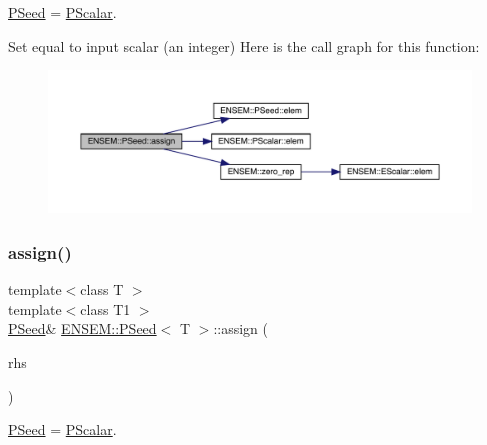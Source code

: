 \mbox{\hyperlink{classENSEM_1_1PSeed}{P\+Seed}} = \mbox{\hyperlink{classENSEM_1_1PScalar}{P\+Scalar}}. 

Set equal to input scalar (an integer) Here is the call graph for this function\+:
\nopagebreak
\begin{figure}[H]
\begin{center}
\leavevmode
\includegraphics[width=350pt]{dc/d14/classENSEM_1_1PSeed_a8d74bd21af23dfb165937c3bb546ea8f_cgraph}
\end{center}
\end{figure}
\mbox{\label{classENSEM_1_1PSeed_a8d74bd21af23dfb165937c3bb546ea8f}} 
\subsubsection{\texorpdfstring{assign()}{assign()}\hspace{0.1cm}{\footnotesize\ttfamily [3/3]}}
{\footnotesize\ttfamily template$<$class T $>$ \\
template$<$class T1 $>$ \\
\mbox{\hyperlink{classENSEM_1_1PSeed}{P\+Seed}}\& \mbox{\hyperlink{classENSEM_1_1PSeed}{E\+N\+S\+E\+M\+::\+P\+Seed}}$<$ T $>$\+::assign (\begin{DoxyParamCaption}\item[{const \mbox{\hyperlink{classENSEM_1_1PScalar}{P\+Scalar}}$<$ T1 $>$ \&}]{rhs }\end{DoxyParamCaption})\hspace{0.3cm}{\ttfamily [inline]}}



\mbox{\hyperlink{classENSEM_1_1PSeed}{P\+Seed}} = \mbox{\hyperlink{classENSEM_1_1PScalar}{P\+Scalar}}. 

